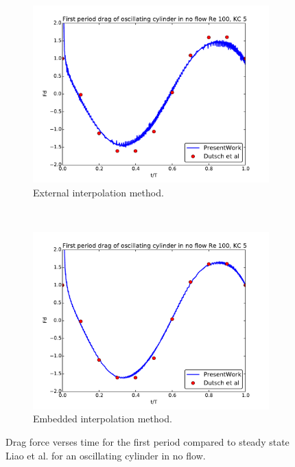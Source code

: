 \begin{figure}[!htb]
	\centering
	\begin{subfigure}{0.4\textwidth}
		\includegraphics[width=\linewidth]{staticexinit}
		\caption{External interpolation method.}
	\end{subfigure}
	~
	\begin{subfigure}{0.4\textwidth}
		\includegraphics[width=\linewidth]{staticeminit}
		\caption{Embedded interpolation method.}
	\end{subfigure}
	\caption{Drag force verses time for the first period compared to steady state Liao et al. for an oscillating cylinder in no flow.}
	\label{fig:staticInit}
\end{figure}

